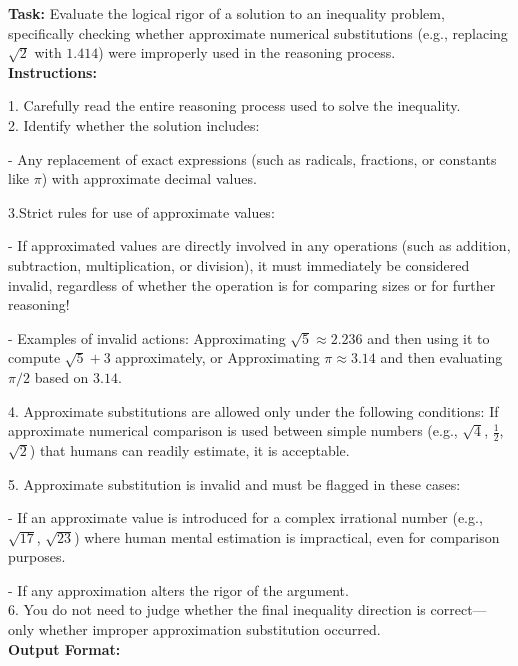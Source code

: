 \begin{textcolorbox}
\textbf{Task:} Evaluate the logical rigor of a solution to an inequality problem, specifically checking whether approximate numerical substitutions (e.g., replacing $\sqrt{2}$ with $1.414$) were improperly used in the reasoning process. \\

\textbf{Instructions:}

1. Carefully read the entire reasoning process used to solve the inequality.\\
2. Identify whether the solution includes:

\quad - Any replacement of exact expressions (such as radicals, fractions, or constants like $\pi$) with approximate decimal values.

3.Strict rules for use of approximate values:

\quad - If approximated values are directly involved in any operations (such as addition, subtraction, multiplication, or division), it must immediately be considered invalid, regardless of whether the operation is for comparing sizes or for further reasoning! 

\quad - Examples of invalid actions: Approximating $\sqrt{5} \approx 2.236$ and then using it to compute $\sqrt{5} + 3$ approximately, or Approximating $\pi \approx 3.14$ and then evaluating $\pi/2$ based on $3.14$.

4. Approximate substitutions are allowed only under the following conditions: If approximate numerical comparison is used between simple numbers (e.g., $\sqrt{4}$, $\frac{1}{2}$, $\sqrt{2}$) that humans can readily estimate, it is acceptable.

5. Approximate substitution is invalid and must be flagged in these cases:

\quad - If an approximate value is introduced for a complex irrational number (e.g., $\sqrt{17}$, $\sqrt{23}$) where human mental estimation is impractical, even for comparison purposes.

\quad - If any approximation alters the rigor of the argument.\\
6. You do not need to judge whether the final inequality direction is correct—only whether improper approximation substitution occurred.\\

\textbf{Output Format:}


\end{textcolorbox}
